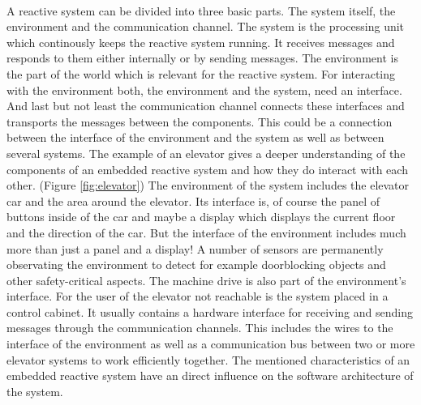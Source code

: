 {\noindent\\ A reactive system can be divided into three basic parts. The system itself, the environment and the communication channel. The system is the processing unit which continously keeps the reactive system running. It receives messages and responds to them either internally or by sending messages. The environment is the part of the world which is relevant for the reactive system. For interacting with the environment both, the environment and the system, need an interface. And last but not least the communication channel connects these interfaces and transports the messages between the components. This could be a connection between the interface of the environment and the system as well as between several systems. \cite[cf.][11-19]{Wieringa2003} The example of an elevator gives a deeper understanding of the components of an embedded reactive system and how they do interact with each other. (Figure \ref{fig:elevator}) The environment of the system includes the elevator car and the area around the elevator. Its interface is, of course the panel of buttons inside of the car and maybe a display which displays the current floor and the direction of the car. But the interface of the environment includes much more than just a panel and a display! A number of sensors are permanently observating the environment to detect for example doorblocking objects and other safety-critical aspects. The machine drive is also part of the environment's interface. For the user of the elevator not reachable is the system placed in a control cabinet. It usually contains a hardware interface for receiving and sending messages through the communication channels. This includes the wires to the interface of the environment as well as a communication bus between two or more elevator systems to work efficiently together. The mentioned characteristics of an embedded reactive system have an direct influence on the software architecture of the system. 

}
